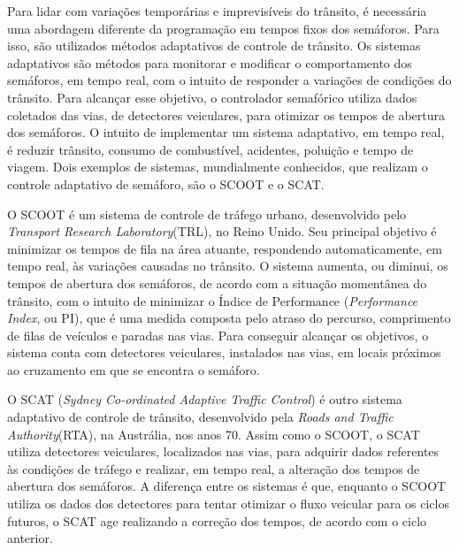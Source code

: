 Para lidar com variações temporárias e imprevisíveis do trânsito, é necessária uma abordagem diferente da programação em tempos fixos dos semáforos. Para isso, são utilizados métodos adaptativos de controle de trânsito.
Os sistemas adaptativos são métodos para monitorar e modificar o comportamento dos semáforos, em tempo real, com o intuito de responder a variações de condições do trânsito. Para alcançar esse objetivo, o controlador semafórico utiliza dados coletados das vias, de detectores veiculares, para otimizar os tempos de abertura dos semáforos.
O intuito de implementar um sistema adaptativo, em tempo real, é reduzir trânsito, consumo de combustível, acidentes, poluição e tempo de viagem.
Dois exemplos de sistemas, mundialmente conhecidos, que realizam o controle adaptativo de semáforo, são o SCOOT e o SCAT.

O SCOOT é um sistema de controle de tráfego urbano, desenvolvido pelo \textit{Transport Research Laboratory}(TRL), no Reino Unido. Seu principal objetivo é minimizar os tempos de fila na área atuante, respondendo automaticamente, em tempo real, às variações causadas no trânsito. O sistema aumenta, ou diminui, os tempos de abertura dos semáforos, de acordo com a situação momentânea do trânsito, com o intuito de minimizar o Índice de Performance (\textit{Performance Index}, ou PI), que é uma medida composta pelo atraso do percurso, comprimento de filas de veículos e paradas nas vias. Para conseguir alcançar os objetivos, o sistema conta com detectores veiculares, instalados nas vias, em locais próximos ao cruzamento em que se encontra o semáforo.


O SCAT (\textit{Sydney Co-ordinated Adaptive Traffic Control}) é outro sistema adaptativo de controle de trânsito, desenvolvido pela \textit{Roads and Traffic Authority}(RTA), na Austrália, nos anos 70. Assim como o SCOOT, o SCAT utiliza detectores veiculares, localizados nas vias, para adquirir dados referentes às condições de tráfego e realizar, em tempo real, a alteração dos tempos de abertura dos semáforos.
A diferença entre os sistemas é que, enquanto o SCOOT utiliza os dados dos detectores para tentar otimizar o fluxo veicular para os ciclos futuros, o SCAT age realizando a correção dos tempos, de acordo com o ciclo anterior.


